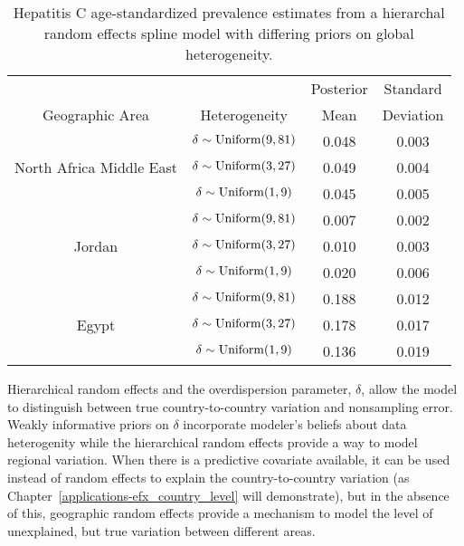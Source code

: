     \begin{table}[h]
        \begin{center}
        \begin{tabular}{|c|c|c|c|}
            \hline
                & & Posterior & Standard \\
                Geographic Area & Heterogeneity & Mean & Deviation \\
            \hline
                & $\delta \sim \operatorname{Uniform}(9,81)$ & 0.048 & 0.003 \\
                North Africa Middle East & $\delta \sim \operatorname{Uniform}(3,27)$ & 0.049 & 0.004 \\
                & $\delta \sim \operatorname{Uniform}(1,9)$ & 0.045 & 0.005 \\
            \hline
                & $\delta \sim \operatorname{Uniform}(9,81)$ & 0.007 & 0.002 \\
                Jordan & $\delta \sim \operatorname{Uniform}(3,27)$ & 0.010 & 0.003 \\
                & $\delta \sim \operatorname{Uniform}(1,9)$ & 0.020 & 0.006 \\
            \hline
                & $\delta \sim \operatorname{Uniform}(9,81)$ & 0.188 & 0.012 \\
                Egypt & $\delta \sim \operatorname{Uniform}(3,27)$ & 0.178 & 0.017 \\
                & $\delta \sim \operatorname{Uniform}(1,9)$ & 0.136 & 0.019 \\
            \hline
        \end{tabular}
        \end{center}
        \caption{ Hepatitis C age-standardized prevalence estimates
          from a hierarchal random effects spline model with differing
          priors on global heterogeneity.}
        \label{tab:app-hepc global rfx}
    \end{table}

Hierarchical random effects and the overdispersion parameter,
$\delta$, allow the model to distinguish between true
country-to-country variation and nonsampling error.  Weakly
informative priors on $\delta$ incorporate modeler's beliefs about
data heterogenity while the hierarchical random effects provide a way
to model regional variation.  When there is a predictive covariate
available, it can be used instead of random effects to explain the
country-to-country variation (as
Chapter~\ref{applications-efx_country_level} will demonstrate), but in
the absence of this, geographic random effects provide a mechanism to
model the level of unexplained, but true variation between different
areas.

